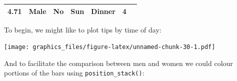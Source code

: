 \documentclass[]{article}
\newenvironment{Shaded}{\begin{snugshade}}{\end{snugshade}}
\newcommand{\KeywordTok}[1]{\textcolor[rgb]{0.13,0.29,0.53}{\textbf{#1}}}
\newcommand{\DataTypeTok}[1]{\textcolor[rgb]{0.13,0.29,0.53}{#1}}
\newcommand{\StringTok}[1]{\textcolor[rgb]{0.31,0.60,0.02}{#1}}
\newcommand{\OperatorTok}[1]{\textcolor[rgb]{0.81,0.36,0.00}{\textbf{#1}}}
\newcommand{\NormalTok}[1]{#1}
\theoremstyle{definition}
\theoremstyle{definition}
\theoremstyle{definition}
\theoremstyle{remark}
\begin{document}
\begin{longtable}[]{@{}ccccccc@{}}
\begin{minipage}[t]{0.08\columnwidth}
4.71\strut
\end{minipage} & \begin{minipage}[t]{0.10\columnwidth}\centering\strut
Male\strut
\end{minipage} & \begin{minipage}[t]{0.10\columnwidth}\centering\strut
No\strut
\end{minipage} & \begin{minipage}[t]{0.07\columnwidth}\centering\strut
Sun\strut
\end{minipage} & \begin{minipage}[t]{0.10\columnwidth}\centering\strut
Dinner\strut
\end{minipage} & \begin{minipage}[t]{0.07\columnwidth}\centering\strut
4\strut
\end{minipage}\tabularnewline
\bottomrule
\end{longtable}

To begin, we might like to plot tips by time of day:

\begin{Shaded}
\end{Shaded}

\texttt{[image: graphics\_files/figure-latex/unnamed-chunk-30-1.pdf]}

And to facilitate the comparison between men and women we could colour
portions of the bars using \texttt{position\_stack()}:

\begin{Shaded}
\end{Shaded}
\end{document}
